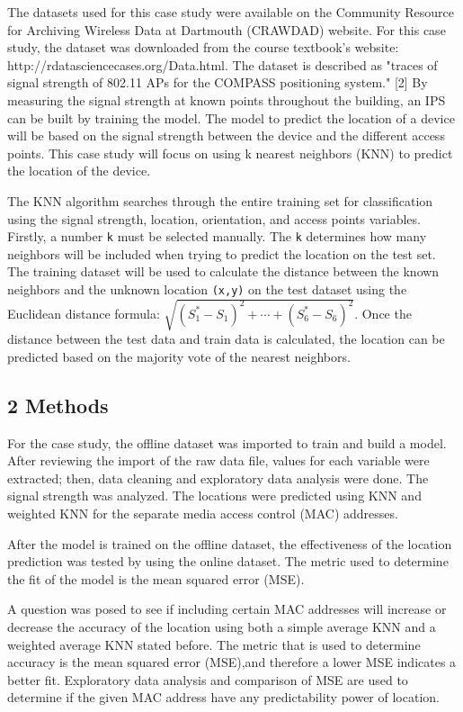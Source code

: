 \documentclass[11pt]{article}
\begin{document}
The datasets used for this case study were available on the Community
Resource for Archiving Wireless Data at Dartmouth (CRAWDAD) website. For
this case study, the dataset was downloaded from the course textbook's
website: http://rdatasciencecases.org/Data.html. The dataset is
described as "traces of signal strength of 802.11 APs for the COMPASS
positioning system." {[}2{]} By measuring the signal strength at known
points throughout the building, an IPS can be built by training the
model. The model to predict the location of a device will be based on
the signal strength between the device and the different access points.
This case study will focus on using k nearest neighbors (KNN) to predict
the location of the device.

The KNN algorithm searches through the entire training set for
classification using the signal strength, location, orientation, and
access points variables. Firstly, a number \texttt{k} must be selected
manually. The \texttt{k} determines how many neighbors will be included
when trying to predict the location on the test set. The training
dataset will be used to calculate the distance between the known
neighbors and the unknown location \texttt{(x,y)} on the test dataset
using the Euclidean distance formula:
\(\sqrt{(S_{1}^{*}-S_{1})^{2}+\cdots+(S_{6}^{*}-S_{6})^{2}}\). Once the
distance between the test data and train data is calculated, the
location can be predicted based on the majority vote of the nearest
neighbors.

    

    \subsection{2 Methods}\label{methods}

    For the case study, the offline dataset was imported to train and build
a model. After reviewing the import of the raw data file, values for
each variable were extracted; then, data cleaning and exploratory data
analysis were done. The signal strength was analyzed. The locations were
predicted using KNN and weighted KNN for the separate media access
control (MAC) addresses.

After the model is trained on the offline dataset, the effectiveness of
the location prediction was tested by using the online dataset. The
metric used to determine the fit of the model is the mean squared error
(MSE).

A question was posed to see if including certain MAC addresses will
increase or decrease the accuracy of the location using both a simple
average KNN and a weighted average KNN stated before. The metric that is
used to determine accuracy is the mean squared error (MSE),and therefore
a lower MSE indicates a better fit. Exploratory data analysis and
comparison of MSE are used to determine if the given MAC address have
any predictability power of location.
\end{document}
